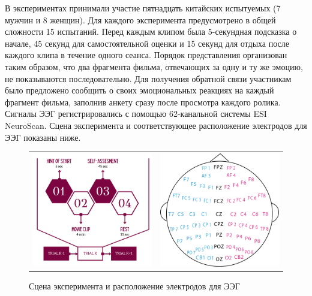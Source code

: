\documentclass{article}
\begin{document}
В экспериментах принимали участие пятнадцать китайских испытуемых (7 мужчин и 8 женщин). Для каждого эксперимента предусмотрено в общей сложности 15 испытаний. Перед каждым клипом была 5-секундная подсказка о начале, 45 секунд для самостоятельной оценки и 15 секунд для отдыха после каждого клипа в течение одного сеанса. Порядок представления организован таким образом, что два фрагмента фильма, отвечающих за одну и ту же эмоцию, не показываются последовательно. Для получения обратной связи участникам было предложено сообщить о своих эмоциональных реакциях на каждый фрагмент фильма, заполнив анкету сразу после просмотра каждого ролика. Сигналы ЭЭГ регистрировались с помощью 62-канальной системы ESI NeuroScan. Сцена эксперимента и соответствующее расположение электродов для ЭЭГ показаны ниже.

\begin{figure}[h]
\begin{tabular}{cc}
  \includegraphics[width=75mm]{1.pdf} &   \includegraphics[width=75mm]{2.png} \\
\end{tabular}
\caption{Сцена эксперимента и расположение электродов для ЭЭГ}
\end{figure}
\end{document}
